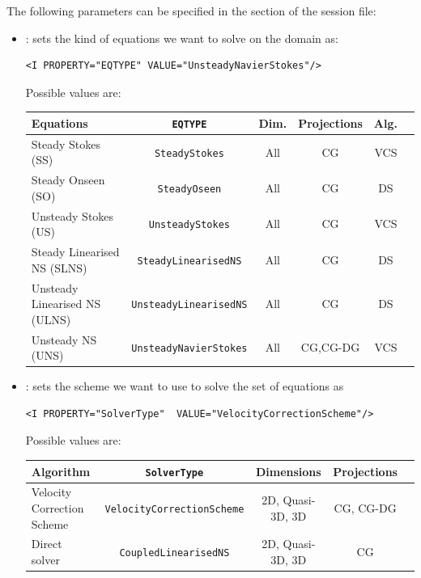 The following parameters can be specified in the  section of
the session file:

\begin{itemize}
\item {}: sets the kind of equations we want to solve on the domain
as:

\begin{lstlisting}[style=XMLStyle]
<I PROPERTY="EQTYPE" VALUE="UnsteadyNavierStokes"/>
\end{lstlisting}

Possible values are:
\begin{center}
\footnotesize
\renewcommand\arraystretch{1.2}
\begin{tabular}{lccccc}
\toprule
{Equations} & {\texttt{EQTYPE}} &{Dim.}&{Projections} & Alg.\\
\midrule
Steady Stokes (SS)& \texttt{SteadyStokes} & All & CG &VCS \\
Steady Onseen (SO) & \texttt{SteadyOseen} & All & CG& DS \\
Unsteady Stokes (US) & \texttt{UnsteadyStokes} & All & CG &VCS \\
Steady Linearised NS (SLNS) & \texttt{SteadyLinearisedNS} & All & CG & DS \\
Unsteady Linearised NS (ULNS) & \texttt{UnsteadyLinearisedNS} & All & CG & DS \\
Unsteady NS (UNS) & \texttt{UnsteadyNavierStokes} & All & CG,CG-DG & VCS \\
\bottomrule
\end{tabular}
\end{center}


\item {}: sets the scheme we want to use to solve the set of
equations as
\begin{lstlisting}[style=XMLStyle]
<I PROPERTY="SolverType"  VALUE="VelocityCorrectionScheme"/>
\end{lstlisting}

Possible values are:
\begin{center}
\footnotesize
\begin{tabular}{lcccc}
\toprule
{Algorithm} & {\texttt{SolverType}} &{Dimensions}&{Projections} \\
\midrule
Velocity Correction Scheme & \texttt{VelocityCorrectionScheme} & 2D, Quasi-3D, 3D & CG, CG-DG\\
Direct solver & \texttt{CoupledLinearisedNS} & 2D, Quasi-3D, 3D &CG\\
\bottomrule
\end{tabular}
\end{center}


\end{itemize}
